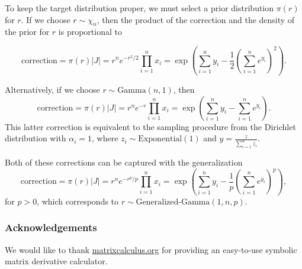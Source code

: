 \documentclass[11pt]{article}
\begin{document}
To keep the target distribution proper, we must select a prior
distribution $\pi(r)$ for $r$.  If we choose $r \sim \chi_n$, then the
product of the correction and the density of the prior for $r$ is
proportional to

\[
  \mathrm{correction}
  = \pi(r) |J| = r^n e^{-r^2/2} \prod_{i=1}^n x_i
  = \exp\left(\sum_{i=1}^n y_i - \frac{1}{2}\left(\sum_{i=1}^n
      e^{y_i}\right)^2\right).
\]

Alternatively, if we choose $r \sim \mathrm{Gamma}(n, 1)$, then
\[
  \mathrm{correction} = \pi(r) |J| = r^n e^{-r} \prod_{i=1}^n x_i =
  \exp\left(\sum_{i=1}^n y_i - \sum_{i=1}^n e^{y_i}\right).
\]
This latter correction is equivalent to the sampling procedure from
the Dirichlet distribution with $\alpha_i=1$, where
$z_i \sim \mathrm{Exponential}(1)$ and
$y = \frac{z}{\sum_{i=1}^n z_i}$.

Both of these corrections can be captured with the generalization
\[
  \mathrm{correction}
  = \pi(r) |J|
  = r^n e^{-r^p/p} \prod_{i=1}^n x_i
  = \exp\left(\sum_{i=1}^n y_i - \frac{1}{p} \left(\sum_{i=1}^n e^{y_i}\right)^p\right),
\]
for $p > 0$, which corresponds to $r \sim \text{Generalized-Gamma}(1, n, p)$.


\subsubsection*{Acknowledgements}

We would like to thank \url{matrixcalculus.org} for providing an
easy-to-use symbolic matrix derivative calculator.



{}

\end{document}

